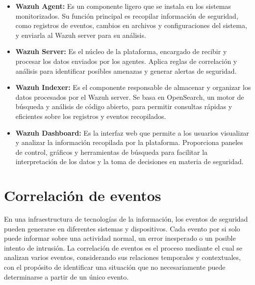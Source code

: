 \begin{itemize}
    \item \textbf{Wazuh Agent:} Es un componente ligero que se instala en los sistemas monitorizados. Su función principal es recopilar información de seguridad, como registros de eventos, cambios en archivos y configuraciones del sistema, y enviarla al Wazuh server para su análisis.
    \item \textbf{Wazuh Server:} Es el núcleo de la plataforma, encargado de recibir y procesar los datos enviados por los agentes. Aplica reglas de correlación y análisis para identificar posibles amenazas y generar alertas de seguridad.
    \item \textbf{Wazuh Indexer:} Es el componente responsable de almacenar y organizar los datos procesados por el Wazuh server. Se basa en OpenSearch, un motor de búsqueda y análisis de código abierto, para permitir consultas rápidas y eficientes sobre los registros y eventos recopilados.
    \item \textbf{Wazuh Dashboard:} Es la interfaz web que permite a los usuarios visualizar y analizar la información recopilada por la plataforma. Proporciona paneles de control, gráficos y herramientas de búsqueda para facilitar la interpretación de los datos y la toma de decisiones en materia de seguridad.
\end{itemize}

\section{Correlación de eventos}
En una infraestructura de tecnologías de la información, los eventos de seguridad pueden generarse en diferentes sistemas y dispositivos. Cada evento por si solo puede informar sobre una actividad normal, un error inesperado o un posible intento de intrusión.
La correlación de eventos es el proceso mediante el cual se analizan varios eventos, considerando sus relaciones temporales y contextuales, con el propósito de identificar una situación que no necesariamente puede determinarse a partir de un único evento.

